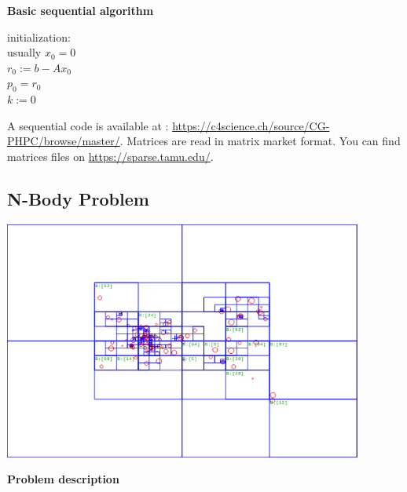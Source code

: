 \documentclass[10pt]{article}
\begin{document}
\textbf{Basic sequential algorithm}
\\


\begin{algorithm}[H]
	initialization:\\
	usually $x_0 = 0$\\
	$r_0 := b - A x_0$\\
	$p_0 = r_0$ \\
	$k := 0$\\
\end{algorithm}

A sequential code is available at : \url{https://c4science.ch/source/CG-PHPC/browse/master/}. Matrices are read in matrix market format. You can find matrices files on \url{https://sparse.tamu.edu/}. 


\subsection{N-Body Problem}

\begin{center}
\includegraphics[width=118mm]{../../Day2/images/nbody.png}
\end{center}

\textbf{Problem description}
\\
\end{document}
